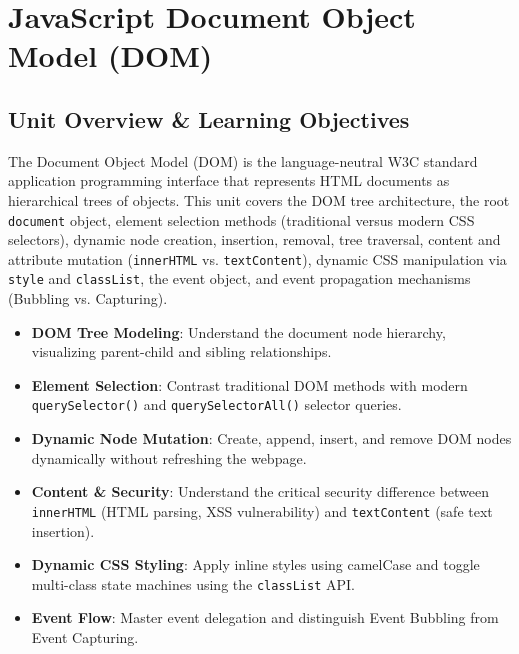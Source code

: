 \chapter{JavaScript Document Object Model (DOM)}
\label{chap:javascript-dom}

\section{Unit Overview \& Learning Objectives}

\begin{conceptbox}
The Document Object Model (DOM) is the language-neutral W3C standard application programming interface that represents HTML documents as hierarchical trees of objects. This unit covers the DOM tree architecture, the root \texttt{document} object, element selection methods (traditional versus modern CSS selectors), dynamic node creation, insertion, removal, tree traversal, content and attribute mutation (\texttt{innerHTML} vs. \texttt{textContent}), dynamic CSS manipulation via \texttt{style} and \texttt{classList}, the event object, and event propagation mechanisms (Bubbling vs. Capturing).
\end{conceptbox}

\begin{itemize}[leftmargin=1.5em]
    \item \textbf{DOM Tree Modeling}: Understand the document node hierarchy, visualizing parent-child and sibling relationships.
    \item \textbf{Element Selection}: Contrast traditional DOM methods with modern \texttt{querySelector()} and \texttt{querySelectorAll()} selector queries.
    \item \textbf{Dynamic Node Mutation}: Create, append, insert, and remove DOM nodes dynamically without refreshing the webpage.
    \item \textbf{Content \& Security}: Understand the critical security difference between \texttt{innerHTML} (HTML parsing, XSS vulnerability) and \texttt{textContent} (safe text insertion).
    \item \textbf{Dynamic CSS Styling}: Apply inline styles using camelCase and toggle multi-class state machines using the \texttt{classList} API.
    \item \textbf{Event Flow}: Master event delegation and distinguish Event Bubbling from Event Capturing.
\end{itemize}

